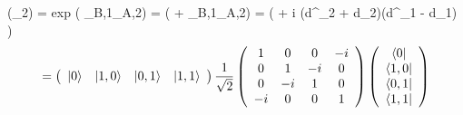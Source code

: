 \documentclass[Master]{subfiles}
\begin{document}
\tau(\sigma_2) = exp \left(  \gamma_{B,1}\gamma_{A,2}\right) =  ( + \gamma_{B,1}\gamma_{A,2}) =  \left(  + i (d^{\dag}_2 + d_2)(d^{\dag}_1 - d_1)  \right)$$
\begin{dmath}\label{math:UnusualEchchange}=
\left(
\begin{array}{cccc}
     \ket{0} & \ket{1,0} & \ket{0,1} & \ket{1,1}
\end{array}
\right)
\frac{1}{\sqrt{2}}
\left(
\begin{array}{cccc}
   1  &  0 & 0 & - i \\
   0  & 1 & - i & 0 \\
    0 & -i & 1  &  0\\
    -i & 0 & 0  & 1
\end{array}
\right)
\left(
\begin{array}{c}
     \bra{0}\\
     \bra{1,0}\\
     \bra{0,1}\\
     \bra{1,1}
\end{array}
\right)
\end{dmath}
\end{document}
